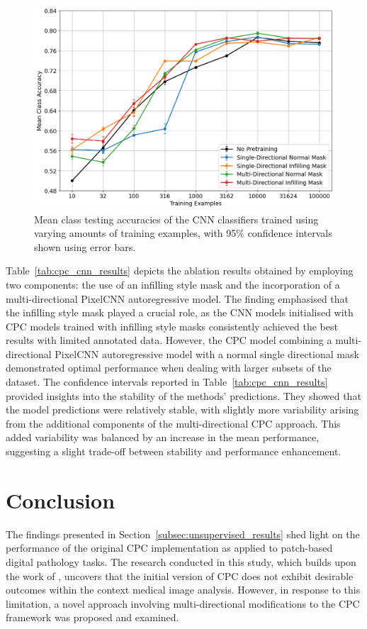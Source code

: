 \begin{figure}[tb]
	\centering
	\includegraphics[width=\textwidth]{images/cpc_cnn_results.png}
	\caption{Mean class testing accuracies of the CNN classifiers trained using varying amounts of training examples, with 95\% confidence intervals shown using error bars.}
	\label{fig:cpc_cnn_results}
\end{figure}

Table~\ref{tab:cpc_cnn_results} depicts the ablation results obtained by employing two components: the use of an infilling style mask and the incorporation of a multi-directional PixelCNN autoregressive model. The finding emphasised that the infilling style mask played a crucial role, as the CNN models initialised with CPC models trained with infilling style masks consistently achieved the best results with limited annotated data. However, the CPC model combining a multi-directional PixelCNN autoregressive model with a normal single directional mask demonstrated optimal performance when dealing with larger subsets of the dataset. The confidence intervals reported in Table~\ref{tab:cpc_cnn_results} provided insights into the stability of the methods' predictions. They showed that the model predictions were relatively stable, with slightly more variability arising from the additional components of the multi-directional CPC approach. This added variability was balanced by an increase in the mean performance, suggesting a slight trade-off between stability and performance enhancement.



\section{Conclusion}
\label{sec:conclusion}
The findings presented in Section~\ref{subsec:unsupervised_results} shed light on the performance of the original CPC implementation as applied to patch-based digital pathology tasks. The research conducted in this study, which builds upon the work of \cite{oord2018representation}, uncovers that the initial version of CPC does not exhibit desirable outcomes within the context medical image analysis. However, in response to this limitation, a novel approach involving multi-directional modifications to the CPC framework was proposed and examined. 

